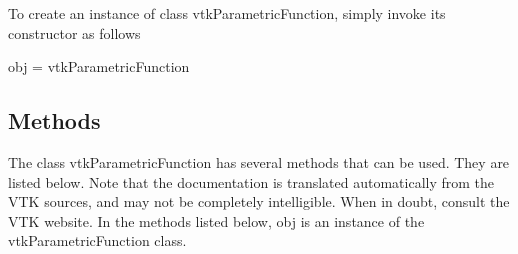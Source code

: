 To create an instance of class vtk\-Parametric\-Function, simply invoke its constructor as follows \begin{DoxyVerb}  obj = vtkParametricFunction
\end{DoxyVerb}
 \hypertarget{vtkwidgets_vtkxyplotwidget_Methods}{}\subsection{Methods}\label{vtkwidgets_vtkxyplotwidget_Methods}
The class vtk\-Parametric\-Function has several methods that can be used. They are listed below. Note that the documentation is translated automatically from the V\-T\-K sources, and may not be completely intelligible. When in doubt, consult the V\-T\-K website. In the methods listed below, {\ttfamily obj} is an instance of the vtk\-Parametric\-Function class. 
